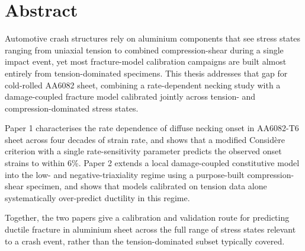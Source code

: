 \chapter*{Abstract}

Automotive crash structures rely on aluminium components that see stress
states ranging from uniaxial tension to combined compression-shear during a
single impact event, yet most fracture-model calibration campaigns are built
almost entirely from tension-dominated specimens. This thesis addresses that
gap for cold-rolled AA6082 sheet, combining a rate-dependent necking study
with a damage-coupled fracture model calibrated jointly across tension- and
compression-dominated stress states.

Paper 1 characterises the rate dependence of diffuse necking onset in
AA6082-T6 sheet across four decades of strain rate, and shows that a modified
Considère criterion with a single rate-sensitivity parameter predicts the
observed onset strains to within 6\%. Paper 2 extends a local damage-coupled
constitutive model into the low- and negative-triaxiality regime using a
purpose-built compression-shear specimen, and shows that models calibrated
on tension data alone systematically over-predict ductility in this regime.

Together, the two papers give a calibration and validation route for
predicting ductile fracture in aluminium sheet across the full range of
stress states relevant to a crash event, rather than the tension-dominated
subset typically covered.
